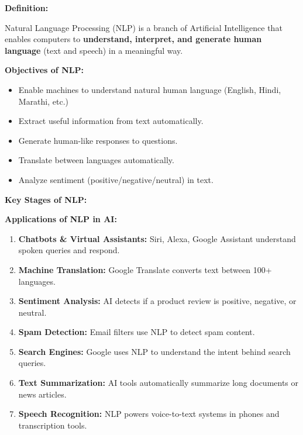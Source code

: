\documentclass[12pt,a4paper]{article}
\newcommand{\term}[1]{\textbf{\color{headingcolor}#1}}
\begin{document}
\begin{answerenv}

\textbf{\color{headingcolor}Definition:}

Natural Language Processing (NLP) is a branch of Artificial Intelligence that enables computers to \textbf{understand, interpret, and generate human language} (text and speech) in a meaningful way.

\vspace{6pt}
\textbf{\color{headingcolor}Objectives of NLP:}
\begin{itemize}[leftmargin=1.5em, itemsep=3pt]
  \item Enable machines to understand natural human language (English, Hindi, Marathi, etc.)
  \item Extract useful information from text automatically.
  \item Generate human-like responses to questions.
  \item Translate between languages automatically.
  \item Analyze sentiment (positive/negative/neutral) in text.
\end{itemize}

\vspace{6pt}
\textbf{\color{headingcolor}Key Stages of NLP:}

\begin{center}
\end{center}

\textbf{\color{headingcolor}Applications of NLP in AI:}
\begin{enumerate}[leftmargin=1.8em, itemsep=4pt]
  \item \term{Chatbots \& Virtual Assistants:} Siri, Alexa, Google Assistant understand spoken queries and respond.
  \item \term{Machine Translation:} Google Translate converts text between 100+ languages.
  \item \term{Sentiment Analysis:} AI detects if a product review is positive, negative, or neutral.
  \item \term{Spam Detection:} Email filters use NLP to detect spam content.
  \item \term{Search Engines:} Google uses NLP to understand the intent behind search queries.
  \item \term{Text Summarization:} AI tools automatically summarize long documents or news articles.
  \item \term{Speech Recognition:} NLP powers voice-to-text systems in phones and transcription tools.
\end{enumerate}

\end{answerenv}
\end{document}
